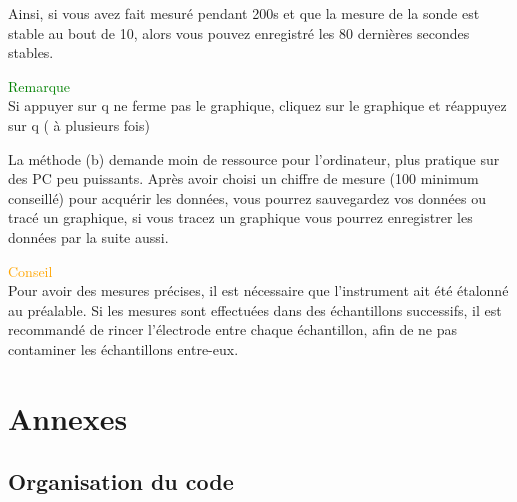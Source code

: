 \documentclass{ipgplicence}
\begin{document}
Ainsi, si vous avez fait mesuré pendant 200s  et que la mesure de la sonde est stable au bout de 10, alors vous pouvez enregistré les 80 dernières secondes stables.
\begin{tcolorbox}[colback=gray!20, colframe=gray]   
    {\Large\textcolor{green}{Remarque}\\}
Si appuyer sur q ne ferme pas le graphique, cliquez sur le graphique et réappuyez sur q ( à plusieurs fois)
\end{tcolorbox}
 La méthode (b) demande moin de ressource pour l'ordinateur, plus pratique sur des PC peu puissants.
Après avoir choisi un chiffre de mesure (100 minimum conseillé) pour acquérir les données, vous pourrez sauvegardez vos données ou tracé un graphique, si vous 
tracez un graphique vous pourrez enregistrer les données par la suite aussi.


\begin{tcolorbox}[colback=gray!20, colframe=gray]   
    {\Large\textcolor{orange}{Conseil}\\}
Pour avoir des mesures précises, il est nécessaire
que l’instrument ait été étalonné au préalable. Si les mesures sont effectuées dans des échantillons
successifs, il est recommandé de rincer l’électrode entre chaque échantillon, afin de ne pas contaminer
les échantillons entre-eux.
\end{tcolorbox}
\vspace{-0.5 cm}
\section{Annexes}
\subsection{Organisation du code}
\label{code}
\end{document}
